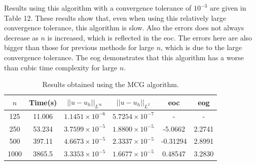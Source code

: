 \documentclass{article}
\numberwithin{equation}{section}
\begin{document}
Results using this algorithm with a convergence tolerance of $10^{-3}$ are given in Table 12. These results show that, even when using this relatively large convergence tolerance, this algorithm is slow. Also the errors does not always decrease as $n$ is increased, which is reflected in the eoc. The errors here are also bigger than those for previous methods for large $n$, which is due to the large convergence tolerance. The eog demonstrates that this algorithm has a worse than cubic time complexity for large $n$.

\begin{table}[H]
\centering
\begin{tabular}{|c|c|c|c|c|c|}
\hline
$n$ & Time(s) & $|| u - u_h ||_{L^{\infty}}$ &$|| u - u_h ||_{L^{2}}$ & eoc & eog \\
\hline
125 & 11.006 & $1.1451 \times 10^{-6}$ & $5.7254 \times 10^{-7}$ & - & - \\
250 & 53.234 & $3.7599 \times 10^{-5}$ & $1.8800 \times 10^{-5}$ & -5.0662 & 2.2741 \\
500 & 397.11 & $4.6673 \times 10^{-5}$ & $2.3337 \times 10^{-5}$ & -0.31294 & 2.8991 \\
1000 & 3865.5 & $3.3353 \times 10^{-5}$ & $1.6677 \times 10^{-5}$ & 0.48547 & 3.2830 \\
\hline
\end{tabular}
\captionsetup{justification=centering}
\caption{Results obtained using the MCG algorithm.}
\end{table}
\end{document}
